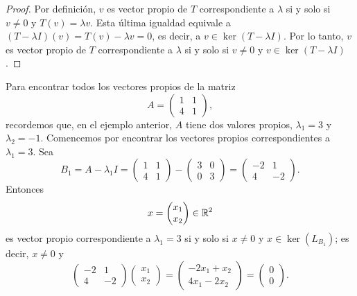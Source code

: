 \documentclass[12pt,a4paper]{book}
\begin{document}
    \begin{proof}
        Por definición, $v$ es vector propio de $T$ correspondiente a $\lambda$ si y solo si $v \neq 0$ y $T(v) = \lambda v$. Esta última igualdad equivale a $(T-\lambda I)(v) = T(v) - \lambda v = 0$, es decir, a $v \in \ker(T-\lambda I)$. Por lo tanto, $v$ es vector propio de $T$ correspondiente a $\lambda$ si y solo si $v \neq 0$ y $v \in \ker(T-\lambda I)$.
    \end{proof}

    \begin{ejemplo}
        Para encontrar todos los vectores propios de la matriz
        \begin{equation*}
            A = \begin{pmatrix} 1 & 1 \\ 4 & 1 \end{pmatrix},
        \end{equation*}
        recordemos que, en el ejemplo anterior, $A$ tiene dos valores propios, $\lambda_1 = 3$ y $\lambda_2 = -1$. Comencemos por encontrar los vectores propios correspondientes a $\lambda_1 = 3$. Sea
        \begin{equation*}
            B_1 = A - \lambda_1 I = \begin{pmatrix} 1 & 1 \\ 4 & 1 \end{pmatrix} - \begin{pmatrix} 3 & 0 \\ 0 & 3 \end{pmatrix} = \begin{pmatrix} -2 & 1 \\ 4 & -2 \end{pmatrix}.
        \end{equation*}
        Entonces
        \begin{equation*}
            x = \begin{pmatrix} x_1 \\ x_2 \end{pmatrix} \in \mathbb{R}^2
        \end{equation*}
        es vector propio correspondiente a $\lambda_1 = 3$ si y solo si $x \neq 0$ y $x \in \ker(L_{B_1})$; es decir, $x \neq 0$ y
        \begin{equation*}
            \begin{pmatrix} -2 & 1 \\ 4 & -2 \end{pmatrix}\begin{pmatrix} x_1 \\ x_2 \end{pmatrix} = \begin{pmatrix} -2x_1 + x_2 \\ 4x_1 - 2x_2 \end{pmatrix} = \begin{pmatrix} 0 \\ 0 \end{pmatrix}.

\end{equation*}
\end{ejemplo}
\end{document}
